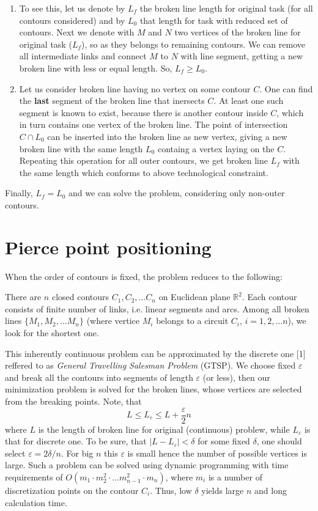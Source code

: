 \documentclass{../download/tPRS2e}
\begin{document}
\begin{enumerate}
    \item{}
To see this, let us denote by
$L_f$ the broken line length for original task
(for all contours considered)
and by 
$L_0$ that length for task with reduced set of contours.
Next we denote with $M$ and $N$
two vertices of the broken line for original task
($L_f$),
so as they belongs to remaining contours.
We can remove all intermediate links and connect 
$M$ to $N$ with line segment,
getting a new broken line with less or equal length.
So, $L_f \ge L_0$.
    \item{}
Let us consider broken line
having no vertex on some contour $C$.
One can find the \textbf{last} segment
of the broken line
that inersects $C$.
At least one such segment is known to exist,
because there is another contour inside $C$,
which in turn contains one vertex of the broken line.
The point of intersection $C \cap L_0$ can be inserted
into the broken line as new vertex,
giving a new broken line with the same length $L_0$
containg a vertex laying on the $C$.
Repeating this operation for all outer contours,
we get broken line $L_f$ with the same length
which conforms to above
technological constraint.
\end{enumerate}

Finally, $L_f = L_0$ and we can solve the problem,
considering only non-outer contours.

\section{Pierce point positioning}

When the order of contours is fixed,
the problem reduces to the following:

There are $n$ closed contours
$C_1, C_2, \dots C_n$ on Euclidean plane
$\mathbb R^2$.
Each contour consists of finite number of links,
i.e. linear segments and arcs.
Among all broken lines $\{M_1, M_2, \dots M_n\}$
(where vertice $M_i$ belongs to a circuit $C_i$,
$i = 1, 2, \dots n$),
we look for the shortest one.

This inherently continuous problem can be approximated
by the discrete one [1]
reffered to as \textit{General Travelling Salesman Problem}
(GTSP).
We choose fixed $\varepsilon$ and break all the contours
into segments of length $\varepsilon$ (or less),
then our minimization problem is solved for the 
broken lines, whose vertices are selected from the
breaking points. Note, that
$$
L \le L_\varepsilon \le L + \frac{\varepsilon}2 n
$$
where $L$ is the length of broken line for original
(continuous) problew,
while $L_\varepsilon$ is that for discrete one.
To be sure, that
$| L - L_\varepsilon | < \delta $
for some fixed $\delta$,
one should select $\varepsilon = 2 \delta /n$.
For big $n$ this $\varepsilon$ is small hence
the number of possible vertices is large.
Such a problem can be solved using dynamic programming
with time requirements of
$O(m_1 \cdot m_2^2 \cdot \dots m_{n-1}^2 \cdot m_n)$,
where $m_i$ is a number of discretization points on the
contour $C_i$.
Thus, low $\delta$ yields large $n$ and long
calculation time.
\end{document}
